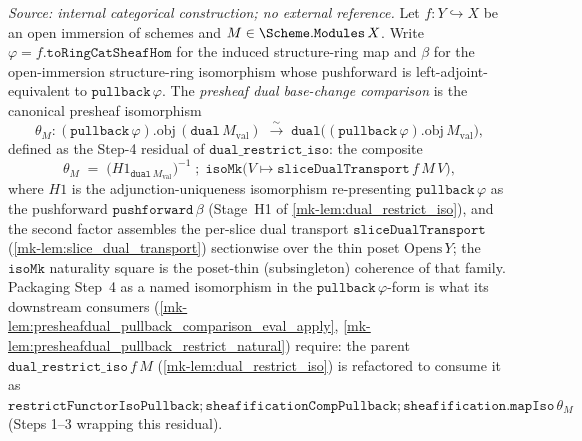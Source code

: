 \begin{definition}\label{mk-def:presheafdual_pullback_comparison}
  \leanok

  \textit{Source: internal categorical construction; no external reference.}
  Let \(f : Y \hookrightarrow X\) be an open immersion of schemes and
  \(M \in \Scheme.\mathtt{Modules}\,X\). Write \(\varphi = f.\mathtt{toRingCatSheafHom}\) for the
  induced structure-ring map and \(\beta\) for the open-immersion structure-ring isomorphism whose
  pushforward is left-adjoint-equivalent to \(\mathtt{pullback}\,\varphi\). The \emph{presheaf dual
  base-change comparison} is the canonical presheaf isomorphism
  \[
    \theta_M : (\mathtt{pullback}\,\varphi).\mathrm{obj}\,(\mathtt{dual}\,M_{\mathrm{val}})
      \;\xrightarrow{\ \sim\ }\;
      \mathtt{dual}\bigl((\mathtt{pullback}\,\varphi).\mathrm{obj}\,M_{\mathrm{val}}\bigr),
  \]
  defined as the Step-4 residual of \(\mathtt{dual\_restrict\_iso}\): the composite
  \[
    \theta_M \;=\; \bigl(H1_{\mathtt{dual}\,M_{\mathrm{val}}}\bigr)^{-1}
      \;\mathbin{;}\; \mathtt{isoMk}\bigl(V \mapsto \mathtt{sliceDualTransport}\,f\,M\,V\bigr),
  \]
  where \(H1\) is the adjunction-uniqueness isomorphism re-presenting \(\mathtt{pullback}\,\varphi\) as
  the pushforward \(\mathtt{pushforward}\,\beta\) (Stage~H1 of \ref{mk-lem:dual_restrict_iso}), and the
  second factor assembles the per-slice dual transport \(\mathtt{sliceDualTransport}\)
  (\ref{mk-lem:slice_dual_transport}) sectionwise over the thin poset \(\mathrm{Opens}\,Y\); the
  \(\mathtt{isoMk}\) naturality square is the poset-thin (subsingleton) coherence of that family.
  Packaging Step~4 as a named isomorphism in the \(\mathtt{pullback}\,\varphi\)-form is what its
  downstream consumers (\ref{mk-lem:presheafdual_pullback_comparison_eval_apply},
  \ref{mk-lem:presheafdual_pullback_restrict_natural}) require: the parent
  \(\mathtt{dual\_restrict\_iso}\,f\,M\) (\ref{mk-lem:dual_restrict_iso}) is refactored to consume it as
  \(\mathtt{restrictFunctorIsoPullback} \mathbin{;} \mathtt{sheafificationCompPullback}
  \mathbin{;} \mathtt{sheafification.mapIso}\,\theta_M\) (Steps 1--3 wrapping this residual).
\end{definition}

